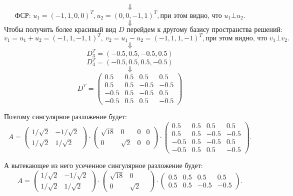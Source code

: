 \documentclass{article}
\begin{document}
$$\Downarrow$$
$$\textrm{ФСР: } u_1=(-1,1,0,0)^T, u_2=(0, 0, -1, 1)^T, \textrm{при этом видно, что } u_1\bot u_2.$$
$$\Downarrow$$
$$\textrm{Чтобы получить более красивый вид $D$ перейдем к другому базису пространства решений:}$$ 
$$v_1=u_1+u_2=(-1,1,-1,1)^T,\ v_2=u_1-u_2=(-1, 1, 1, -1)^T, \textrm{при этом видно, что } v_1\bot v_2.$$
$$\Downarrow$$
$$D_3^T=(-0.5,0.5,-0.5,0.5)$$
$$D_4^T=(-0.5,0.5,0.5,-0.5)$$
$$\Downarrow$$
$$D^T=\left(\begin{array}{rrrr}0.5 & 0.5 & 0.5 & 0.5\\0.5 & 0.5 & -0.5 & -0.5\\-0.5 & 0.5 & -0.5 & 0.5\\-0.5 & 0.5 & 0.5 & -0.5\end{array}\right)$$
\par
Поэтому сингулярное разложение будет:
$$A=\left(\begin{array}{rr}1/\sqrt{2} & -1/\sqrt{2}\\1/\sqrt{2} & 1/\sqrt{2}\end{array}\right)\cdot\left(\begin{array}{rrrr}\sqrt{18} & 0 & 0 & 0\\0 & \sqrt{2} & 0 & 0\end{array}\right)\cdot\left(\begin{array}{rrrr}0.5 & 0.5 & 0.5 & 0.5\\0.5 & 0.5 & -0.5 & -0.5\\-0.5 & 0.5 & -0.5 & 0.5\\-0.5 & 0.5 & 0.5 & -0.5\end{array}\right).$$
\par
А вытекающее из него усеченное сингулярное разложение будет:
$$A=\left(\begin{array}{rr}1/\sqrt{2} & -1/\sqrt{2}\\1/\sqrt{2} & 1/\sqrt{2}\end{array}\right)\cdot\left(\begin{array}{rrrr}\sqrt{18} & 0 &\\0 & \sqrt{2}\end{array}\right)\cdot\left(\begin{array}{rrrr}0.5 & 0.5 & 0.5 & 0.5\\0.5 & 0.5 & -0.5 & -0.5\end{array}\right).$$
\end{document}
